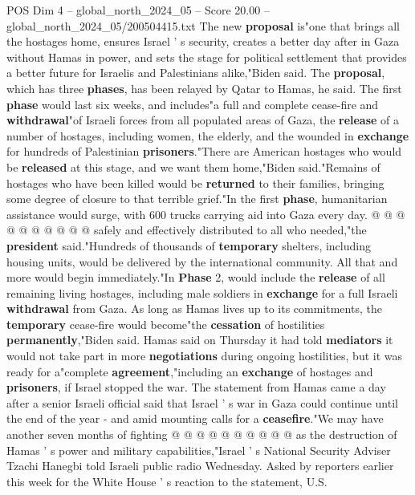\begin{textsample}{POS Dim 4 – global\_north\_2024\_05 – Score 20.00 – global\_north\_2024\_05/200504415.txt}  \label{ex:f4_pos_347}
The new \textbf{proposal} is"one that brings all the hostages home, ensures Israel ' s security, creates a better day after in Gaza without Hamas in power, and sets the stage for political settlement that provides a better future for Israelis and Palestinians alike,"Biden said.
The \textbf{proposal}, which has three \textbf{phases}, has been relayed by Qatar to Hamas, he said.
The first \textbf{phase} would last six weeks, and includes"a full and complete cease-fire and \textbf{withdrawal}"of Israeli forces from all populated areas of Gaza, the \textbf{release} of a number of hostages, including women, the elderly, and the wounded in \textbf{exchange} for hundreds of Palestinian \textbf{prisoners}."There are American hostages who would be \textbf{released} at this stage, and we want them home,"Biden said."Remains of hostages who have been killed would be \textbf{returned} to their families, bringing some degree of closure to that terrible grief."In the first \textbf{phase}, humanitarian assistance would surge, with 600 trucks carrying aid into Gaza every day. @ @ @ @ @ @ @ @ @ @ safely and effectively distributed to all who needed,"the \textbf{president} said."Hundreds of thousands of \textbf{temporary} shelters, including housing units, would be delivered by the international community.
All that and more would begin immediately."In \textbf{Phase} 2, would include the \textbf{release} of all remaining living hostages, including male soldiers in \textbf{exchange} for a full Israeli \textbf{withdrawal} from Gaza.
As long as Hamas lives up to its commitments, the \textbf{temporary} cease-fire would become"the \textbf{cessation} of hostilities \textbf{permanently},"Biden said.
Hamas said on Thursday it had told \textbf{mediators} it would not take part in more \textbf{negotiations} during ongoing hostilities, but it was ready for a"complete \textbf{agreement},"including an \textbf{exchange} of hostages and \textbf{prisoners}, if Israel stopped the war.
The statement from Hamas came a day after a senior Israeli official said that Israel ' s war in Gaza could continue until the end of the year - and amid mounting calls for a \textbf{ceasefire}."We may have another seven months of fighting @ @ @ @ @ @ @ @ @ @ as the destruction of Hamas ' s power and military capabilities,"Israel ' s National Security Adviser Tzachi Hanegbi told Israeli public radio Wednesday.
Asked by reporters earlier this week for the White House ' s reaction to the statement, U.S.

\end{textsample}
